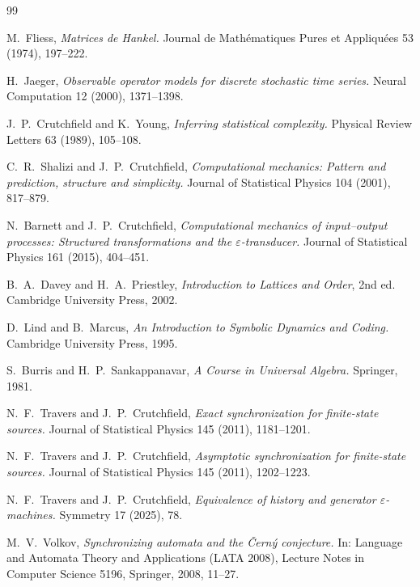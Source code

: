 \documentclass[10pt]{article}
\theoremstyle{definition}
\theoremstyle{remark}
\begin{document}
\begin{thebibliography}{99}

M.~Fliess,
\emph{Matrices de Hankel.}
Journal de Math\'ematiques Pures et Appliqu\'ees 53 (1974), 197--222.

H.~Jaeger,
\emph{Observable operator models for discrete stochastic time series.}
Neural Computation 12 (2000), 1371--1398.

J.~P.~Crutchfield and K.~Young,
\emph{Inferring statistical complexity.}
Physical Review Letters 63 (1989), 105--108.

C.~R.~Shalizi and J.~P.~Crutchfield,
\emph{Computational mechanics: Pattern and prediction, structure and simplicity.}
Journal of Statistical Physics 104 (2001), 817--879.

N.~Barnett and J.~P.~Crutchfield,
\emph{Computational mechanics of input--output processes: Structured
transformations and the $\varepsilon$-transducer.}
Journal of Statistical Physics 161 (2015), 404--451.

B.~A.~Davey and H.~A.~Priestley,
\emph{Introduction to Lattices and Order}, 2nd ed.
Cambridge University Press, 2002.

D.~Lind and B.~Marcus,
\emph{An Introduction to Symbolic Dynamics and Coding.}
Cambridge University Press, 1995.

S.~Burris and H.~P.~Sankappanavar,
\emph{A Course in Universal Algebra.}
Springer, 1981.

N.~F.~Travers and J.~P.~Crutchfield,
\emph{Exact synchronization for finite-state sources.}
Journal of Statistical Physics 145 (2011), 1181--1201.

N.~F.~Travers and J.~P.~Crutchfield,
\emph{Asymptotic synchronization for finite-state sources.}
Journal of Statistical Physics 145 (2011), 1202--1223.

N.~F.~Travers and J.~P.~Crutchfield,
\emph{Equivalence of history and generator $\varepsilon$-machines.}
Symmetry 17 (2025), 78.

M.~V.~Volkov,
\emph{Synchronizing automata and the \v{C}ern\'y conjecture.}
In: Language and Automata Theory and Applications (LATA 2008),
Lecture Notes in Computer Science 5196, Springer, 2008, 11--27.


\end{thebibliography}
\end{document}
